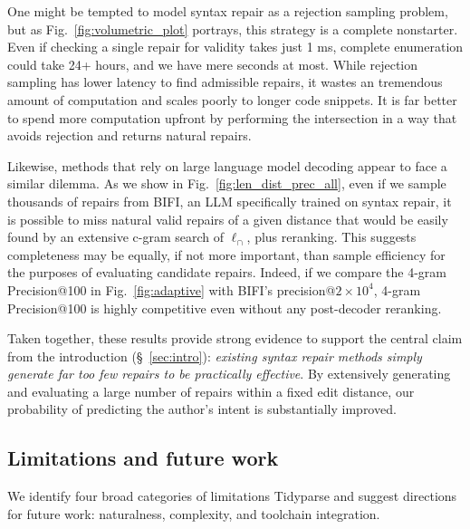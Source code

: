 \documentclass[sigplan,review,acmsmall,nonacm,screen,anonymous]{acmart}\settopmatter{printfolios=false,printccs=false,printacmref=false}
\begin{document}
One might be tempted to model syntax repair as a rejection sampling problem, but as Fig.~\ref{fig:volumetric_plot} portrays, this strategy is a complete nonstarter. Even if checking a single repair for validity takes just 1 ms, complete enumeration could take 24+ hours, and we have mere seconds at most. While rejection sampling has lower latency to find admissible repairs, it wastes an tremendous amount of computation and scales poorly to longer code snippets. It is far better to spend more computation upfront by performing the intersection in a way that avoids rejection and returns natural repairs.

Likewise, methods that rely on large language model decoding appear to face a similar dilemma. As we show in Fig.~\ref{fig:len_dist_prec_all}, even if we sample thousands of repairs from BIFI, an LLM specifically trained on syntax repair, it is possible to miss natural valid repairs of a given distance that would be easily found by an extensive c-gram search of $\ell_\cap$, plus reranking. This suggests completeness may be equally, if not more important, than sample efficiency for the purposes of evaluating candidate repairs. Indeed, if we compare the 4-gram Precision@100 in Fig.~\ref{fig:adaptive} with BIFI's precision@$2\times 10^4$, 4-gram Precision@100 is highly competitive even without any post-decoder reranking.


Taken together, these results provide strong evidence to support the central claim from the introduction (\S~\ref{sec:intro}): \textit{existing syntax repair methods simply generate far too few repairs to be practically effective}. By extensively generating and evaluating a large number of repairs within a fixed edit distance, our probability of predicting the author's intent is substantially improved.

\clearpage\subsection{Limitations and future work}

We identify four broad categories of limitations Tidyparse and suggest directions for future work: naturalness, complexity, and toolchain integration.
\end{document}
